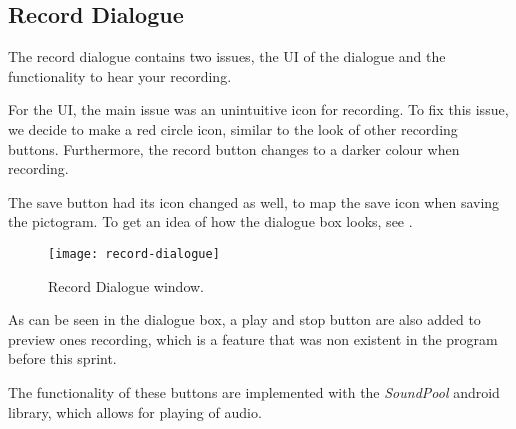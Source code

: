 \subsection{Record Dialogue}
The record dialogue contains two issues, the UI of the dialogue and the functionality to hear your recording.

For the UI, the main issue was an unintuitive icon for recording. To fix this issue, we decide to make a red circle icon, similar to the look of other recording buttons. Furthermore, the record button changes to a darker colour when recording. 

The save button had its icon changed as well, to map the save icon when saving the pictogram.
To get an idea of how the dialogue box looks, see .

\begin{figure}[h]
     \centering
     \texttt{[image: record-dialogue]}
     \caption{Record Dialogue window.}
     \label{fig:record-dialogue}
\end{figure}

As can be seen in the dialogue box, a play and stop button are also added to preview ones recording, which is a feature that was non existent in the program before this sprint.

The functionality of these buttons are implemented with the \textit{SoundPool} android library, which allows for playing of audio.

